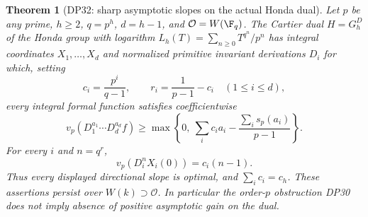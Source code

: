 \documentclass[11pt,a4paper]{article}
\newtheorem{theorem}{Theorem}[section]
\theoremstyle{definition}\newtheorem{remark}[theorem]{Remark}
\begin{document}
\begin{theorem}[DP32: sharp asymptotic slopes on the actual Honda dual]\label{DP32}
Let $p$ be any prime, $h\ge2$, $q=p^h$, $d=h-1$, and $\mathcal O=W(\F_q)$. The Cartier dual $H=G_h^D$ of the Honda group with logarithm $L_h(T)=\sum_{n\ge0}T^{q^n}/p^n$ has integral coordinates $X_1,\ldots,X_d$ and normalized primitive invariant derivations $D_i$ for which, setting
\[
 c_i=\frac{p^i}{q-1},\qquad r_i=\frac1{p-1}-c_i\quad(1\le i\le d),
\]
every integral formal function satisfies coefficientwise
\begin{equation}\label{eq:dual-mixed}
 v_p(D_1^{a_1}\cdots D_d^{a_d}f)
 \ge\max\left\{0,\ \sum_i c_i a_i-\frac{\sum_i s_p(a_i)}{p-1}\right\}.
\end{equation}
For every $i$ and $n=q^r$,
\begin{equation}\label{eq:dual-sharp}
 v_p(D_i^nX_i(0))=c_i(n-1).
\end{equation}
Thus every displayed directional slope is optimal, and $\sum_i c_i=c_h$. These assertions persist over $W(k)\supset\mathcal O$. In particular the order-$p$ obstruction DP30 does not imply absence of positive asymptotic gain on the dual.
\end{theorem}
\end{document}
